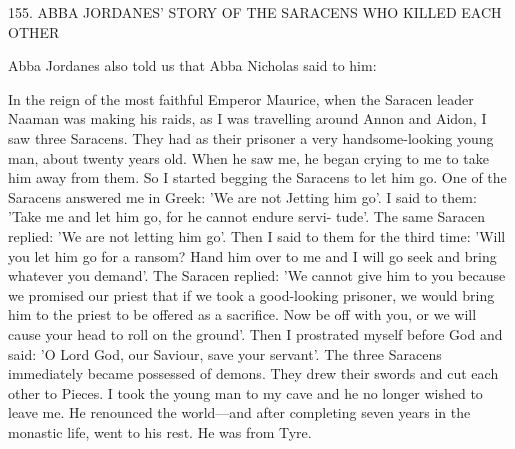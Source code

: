 155. ABBA JORDANES' STORY OF THE
SARACENS WHO KILLED EACH OTHER

Abba Jordanes also told us that Abba Nicholas said to him:

In the reign of the most faithful Emperor Maurice, when the
Saracen leader Naaman was making his raids, as I was travelling
around Annon and Aidon, I saw three Saracens. They had as their
prisoner a very handsome-looking young man, about twenty years
old. When he saw me, he began crying to me to take him away
from them. So I started begging the Saracens to let him go. One of
the Saracens answered me in Greek: 'We are not Jetting him go'. I
said to them: 'Take me and let him go, for he cannot endure servi-
tude'. The same Saracen replied: 'We are not letting him go'. Then
I said to them for the third time: 'Will you let him go for a ransom?
Hand him over to me and I will go seek and bring whatever you
demand'. The Saracen replied: 'We cannot give him to you because
we promised our priest that if we took a good-looking prisoner, we
would bring him to the priest to be offered as a sacrifice. Now be
off with you, or we will cause your head to roll on the ground'.
Then I prostrated myself before God and said: 'O Lord God, our
Saviour, save your servant'. The three Saracens immediately became
possessed of demons. They drew their swords and cut each other to
Pieces. I took the young man to my cave and he no longer wished
to leave me. He renounced the world—and after completing seven
years in the monastic life, went to his rest. He was from Tyre.

